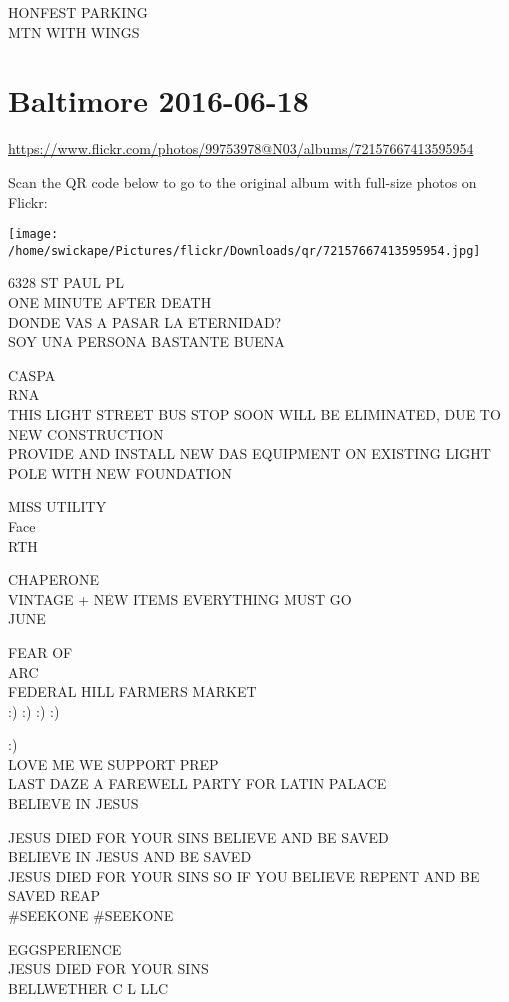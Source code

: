 \documentclass[10pt,letterpaper]{article}
\begin{document}
HONFEST PARKING\\
MTN WITH WINGS
\pagebreak

\section*{Baltimore 2016-06-18}

\url{https://www.flickr.com/photos/99753978@N03/albums/72157667413595954}

Scan the QR code below to go to the original album with full-size photos on Flickr:

\texttt{[image: /home/swickape/Pictures/flickr/Downloads/qr/72157667413595954.jpg]}
\pagebreak

6328 ST PAUL PL\\
ONE MINUTE AFTER DEATH\\
DONDE VAS A PASAR LA ETERNIDAD?\\
SOY UNA PERSONA BASTANTE BUENA

CASPA\\
RNA\\
THIS LIGHT STREET BUS STOP SOON WILL BE ELIMINATED, DUE TO NEW CONSTRUCTION\\
PROVIDE AND INSTALL NEW DAS EQUIPMENT ON EXISTING LIGHT POLE WITH NEW FOUNDATION

MISS UTILITY\\
Face\\
RTH

CHAPERONE\\
VINTAGE + NEW ITEMS EVERYTHING MUST GO\\
JUNE

FEAR OF\\
ARC\\
FEDERAL HILL FARMERS MARKET\\
:) :) :) :)

:)\\
LOVE ME WE SUPPORT PREP\\
LAST DAZE A FAREWELL PARTY FOR LATIN PALACE\\
BELIEVE IN JESUS

JESUS DIED FOR YOUR SINS BELIEVE AND BE SAVED\\
BELIEVE IN JESUS AND BE SAVED\\
JESUS DIED FOR YOUR SINS SO IF YOU BELIEVE REPENT AND BE SAVED REAP\\
\#SEEKONE \#SEEKONE

EGGSPERIENCE\\
JESUS DIED FOR YOUR SINS\\
BELLWETHER C L LLC
\end{document}
